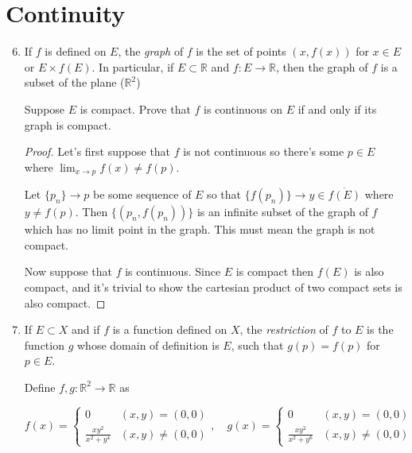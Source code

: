 \documentclass{article}
\begin{document}
\newcommand{\R}{\mathbb{R}}
\newcommand{\claim}{\par\noindent\textit{Claim:}\space}

\setcounter{section}{3}
\section{Continuity}

\begin{enumerate}
\setcounter{enumi}{5}
\item If $f$ is defined on $E$, the \textit{graph} of $f$ is the set of points
      $(x, f(x))$ for $x \in E$ or $E \times f(E)$. In particular, if
      $E \subset \R$ and $f: E \to \R$, then the graph of $f$ is a subset of
      the plane ($\R^2$)

Suppose $E$ is compact. Prove that $f$ is continuous on $E$ if and only if its
graph is compact.

\begin{proof}
Let's first suppose that $f$ is not continuous so there's some $p \in E$ where
$\lim_{x\to p} f(x) \neq f(p)$.

Let $\{p_n\} \to p$ be some sequence of $E$ so that
$\{ f(p_n) \} \to y \in \overline{f(E)}$ where $y \neq f(p)$. Then
$\{ (p_n, f(p_n)) \}$ is an infinite subset of the graph of $f$ which has no
limit point in the graph. This must mean the graph is not compact.

Now suppose that $f$ is continuous. Since $E$ is compact then $f(E)$ is
also compact, and it's trivial to show the cartesian product of two compact sets
is also compact.

\end{proof}

\item If $E \subset X$ and if $f$ is a function defined on $X$, the
      \textit{restriction} of $f$ to $E$ is the function $g$ whose domain of
      definition is $E$, such that $g(p) = f(p)$ for $p \in E$.

Define $f,g : \R^2 \to \R$ as

\[
f(x) =
\begin{cases}
                   0 & (x, y) = (0, 0) \\
\frac{xy^2}{x^2+y^4} & (x, y) \neq (0, 0)
\end{cases},\quad
g(x) =
\begin{cases}
                   0 & (x, y) = (0, 0) \\
\frac{xy^2}{x^2+y^6} & (x, y) \neq (0, 0)
\end{cases}
\]


\end{enumerate}
\end{document}
